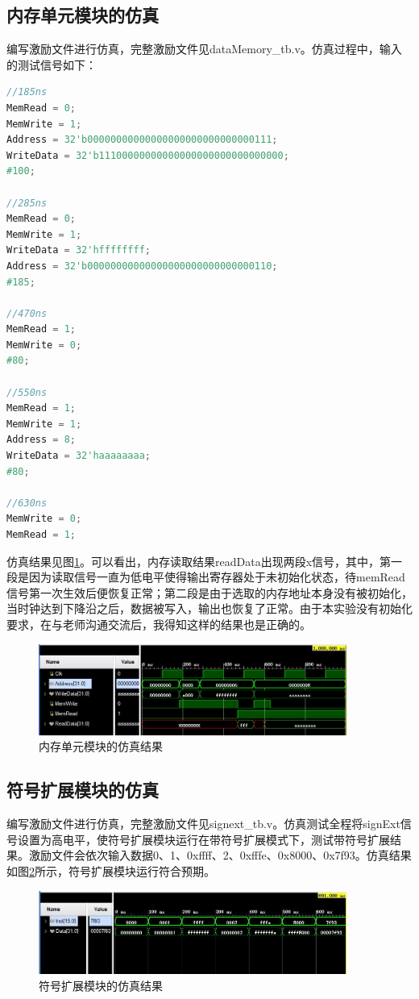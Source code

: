 \documentclass[UTF8]{ctexart}
\begin{document}
\subsection{内存单元模块的仿真}
编写激励文件进行仿真，完整激励文件见dataMemory\_tb.v。仿真过程中，输入的测试信号如下：
\begin{lstlisting}[language=verilog]
//185ns
MemRead = 0;
MemWrite = 1;
Address = 32'b00000000000000000000000000000111;
WriteData = 32'b11100000000000000000000000000000;
#100;

//285ns
MemRead = 0;
MemWrite = 1;
WriteData = 32'hffffffff;
Address = 32'b00000000000000000000000000000110;
#185;

//470ns
MemRead = 1;
MemWrite = 0;
#80;

//550ns
MemRead = 1;
MemWrite = 1;
Address = 8;
WriteData = 32'haaaaaaaa;
#80;

//630ns
MemWrite = 0;
MemRead = 1;
\end{lstlisting}\par
仿真结果见图\ref{fig:sim-mem}。可以看出，内存读取结果readData出现两段x信号，其中，第一段是因为读取信号一直为低电平使得输出寄存器处于未初始化状态，待memRead信号第一次生效后便恢复正常；第二段是由于选取的内存地址本身没有被初始化，当时钟达到下降沿之后，数据被写入，输出也恢复了正常。由于本实验没有初始化要求，在与老师沟通交流后，我得知这样的结果也是正确的。
\begin{figure}[H]
    \centering
    \includegraphics[width=0.9\textwidth]{fig-sim-mem.jpg}
    \caption{内存单元模块的仿真结果}
    \label{fig:sim-mem}
\end{figure}

\subsection{符号扩展模块的仿真}
编写激励文件进行仿真，完整激励文件见signext\_tb.v。仿真测试全程将signExt信号设置为高电平，使符号扩展模块运行在带符号扩展模式下，测试带符号扩展结果。激励文件会依次输入数据0、1、0xffff、2、0xfffe、0x8000、0x7f93。仿真结果如图\ref{fig:sim-ext}所示，符号扩展模块运行符合预期。
\begin{figure}[H]
    \centering
    \includegraphics[width=0.9\textwidth]{fig-sim-ext.jpg}
    \caption{符号扩展模块的仿真结果}
    \label{fig:sim-ext}
\end{figure}
\end{document}
